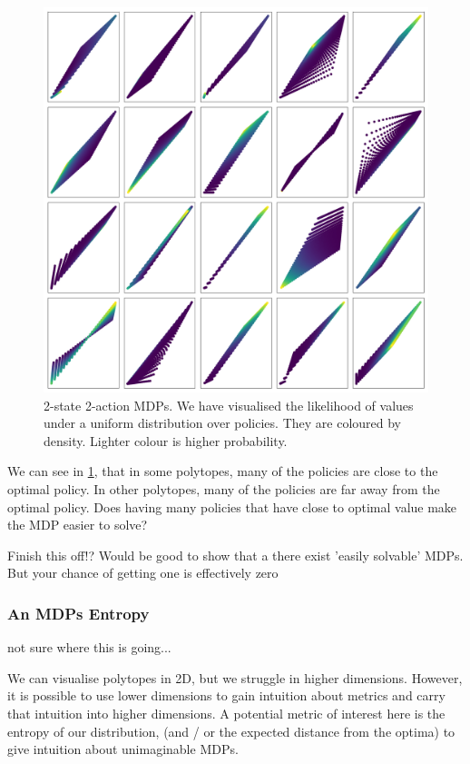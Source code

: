 \begin{figure}
\centering
\includegraphics[width=1\textwidth,height=1\textheight]{../../pictures/figures/polytope_densities.png}
\caption{2-state 2-action MDPs. We have visualised the likelihood of
values under a uniform distribution over policies. They are coloured by density.
Lighter colour is higher probability.}
\label{fig:density}
\end{figure}

We can see in \ref{fig:density}, that in some polytopes, many of the policies are close
to the optimal policy. In other polytopes, many of the policies are far
away from the optimal policy. Does having many policies that have close to
optimal value make the MDP easier to solve?

{\color{red}Finish this off!? Would be good to show that a there exist 'easily solvable'
 MDPs. But your chance of getting one is effectively zero}

\subsubsection{An MDPs Entropy}

{\color{red}not sure where this is going...}

We can visualise polytopes in 2D, but we struggle in higher dimensions.
However, it is possible to use lower dimensions to gain intuition about
metrics and carry that intuition into higher dimensions. A potential
metric of interest here is the entropy of our distribution, (and / or
the expected distance from the optima) to give intuition about
unimaginable MDPs.

